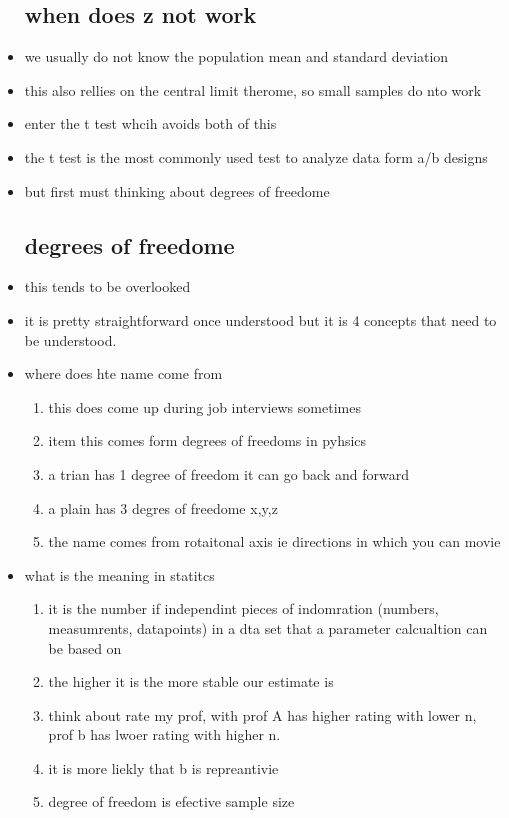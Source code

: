 \documentclass{article}
\begin{document}
\begin{itemize}
\subsection{ when does z not work}
\item we usually do not know the population mean and standard deviation 
\item this also rellies on the central limit therome, so small samples do nto work 
\item enter the t test whcih avoids both of this 
\item the t test is the most commonly used test to analyze data form a/b designs 
\item but first must thinking about degrees of freedome 
\subsection{degrees of freedome}
\item this tends to be overlooked 
\item it is pretty straightforward once understood but it is 4 concepts that need to be understood.
\item where does hte name come from 
\begin{enumerate}
\item this does come up during job interviews sometimes 
\item item this comes form degrees of freedoms in pyhsics
\item a trian has 1 degree of freedom it can go back and forward 
\item a plain has 3 degres of freedome x,y,z
\item the name comes from rotaitonal axis ie directions in which you can movie
\end{enumerate}
\item what is the meaning in statitcs
\begin{enumerate}
    \item it is the number if independint pieces of indomration (numbers, measumrents, datapoints) in a dta set that a parameter calcualtion can be based on 
    \item the higher it is the more stable our estimate is 
    \item think about rate my prof, with prof A has higher rating with lower n, prof b has lwoer rating with higher n. \item it is more liekly that b is repreantivie
    \item degree of freedom is efective sample size

\end{enumerate}
\end{itemize}
\end{document}
